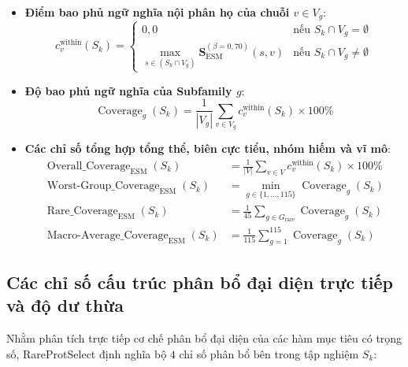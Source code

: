 \begin{itemize}
    \item \textbf{Điểm bao phủ ngữ nghĩa nội phân họ của chuỗi $v \in V_g$}:
    \begin{equation}
    c_v^{\text{within}}(S_k) = \begin{cases}
    0{,}0 & \text{nếu } S_k \cap V_g = \emptyset \\
    \displaystyle\max_{s \in (S_k \cap V_g)} \mathbf{S}_{\text{ESM}}^{(\beta=0{,}70)}(s, v) & \text{nếu } S_k \cap V_g \neq \emptyset
    \end{cases}
    \end{equation}
    
    \item \textbf{Độ bao phủ ngữ nghĩa của Subfamily $g$}:
    \begin{equation}
    \operatorname{Coverage}_g(S_k) = \frac{1}{|V_g|} \sum_{v \in V_g} c_v^{\text{within}}(S_k) \times 100\%
    \end{equation}
    
    \item \textbf{Các chỉ số tổng hợp tổng thể, biên cực tiểu, nhóm hiếm và vĩ mô}:
    \begin{align}
    \operatorname{Overall\_Coverage}_{\text{ESM}}(S_k) &= \frac{1}{|V|} \sum_{v \in V} c_v^{\text{within}}(S_k) \times 100\% \\
    \operatorname{Worst\text{-}Group\_Coverage}_{\text{ESM}}(S_k) &= \min_{g \in \{1, \dots, 115\}} \operatorname{Coverage}_g(S_k) \\
    \operatorname{Rare\_Coverage}_{\text{ESM}}(S_k) &= \frac{1}{45} \sum_{g \in G_{\text{rare}}} \operatorname{Coverage}_g(S_k) \\
    \operatorname{Macro\text{-}Average\_Coverage}_{\text{ESM}}(S_k) &= \frac{1}{115} \sum_{g=1}^{115} \operatorname{Coverage}_g(S_k)
    \end{align}
\end{itemize}

\subsection{Các chỉ số cấu trúc phân bổ đại diện trực tiếp và độ dư thừa}
\label{subsec:allocation_metrics}

Nhằm phân tích trực tiếp cơ chế phân bổ đại diện của các hàm mục tiêu có trọng số, RareProtSelect định nghĩa bộ $4$ chỉ số phân bổ bên trong tập nghiệm $S_k$:

